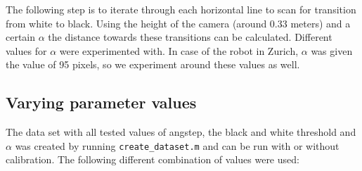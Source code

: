 \documentclass[a4paper, 20pt]{article}
\begin{document}
\begin{figure}[!ht]
\centering
\begin{floatrow}
  
\end{floatrow}
\end{figure}

The following step is to iterate through each horizontal line to scan for
transition from white to black. Using the height of the camera (around 0.33
meters) and a certain $\alpha$ the distance towards these transitions can be
calculated.  Different values for $\alpha$ were experimented with. In case of
the robot in Zurich, $\alpha$ was given the value of 95 pixels, so we experiment
around these values as well.

\subsection{Varying parameter values}
The data set with all tested values of angstep, the black and white
threshold and  $\alpha$ was created by running \texttt{create\_dataset.m} and can be run with
or without calibration. The following different combination of values were
used:\\
\end{document}
